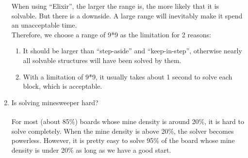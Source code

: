 \documentclass[letter]{article}
\begin{document}
\begin{enumerate}
	When using ``Elixir'', the larger the range is, the more likely that it is solvable. But there is a downside. A large range will inevitably make it spend an unacceptable time. \\
	Therefore, we choose a range of 9*9 as the limitation for 2 reasons: 
	\begin{enumerate}
		\item {It should be larger than ``step-aside'' and ``keep-in-step'', otherwise nearly all solvable structures will have been solved by them.}
		\item {With a limitation of 9*9, it usually takes about 1 second to solve each block, which is acceptable.}
	\end{enumerate}

	\item {Is solving minesweeper hard?} \\
	\\
	For most (about 85\%) boards whose mine density is around 20\%, it is hard to solve completely. When the mine density is above 20\%, the solver becomes powerless. However, it is pretty easy to solve 95\% of the board whose mine density is under 20\% as long as we have a good start.
\end{enumerate}
\end{document}
